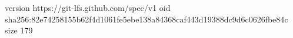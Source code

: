 version https://git-lfs.github.com/spec/v1
oid sha256:82e74258155b62f4d1061fe5ebe138a84368caf443d19388dc9d6c0626fbe84c
size 179
